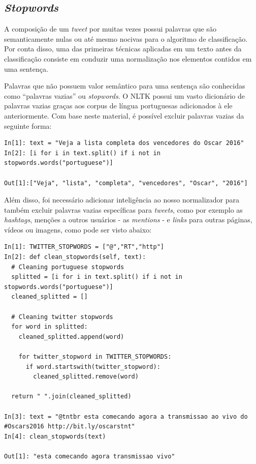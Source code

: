 \subsection{\textit{Stopwords}}

A composição de um \textit{tweet} por muitas vezes possui palavras que são semanticamente nulas ou até mesmo nocivas para o algoritmo de classificação. Por conta disso, uma das primeiras técnicas aplicadas em um texto antes da classificação consiste em conduzir uma normalização nos elementos contidos em uma sentença.

Palavras que não possuem valor semântico para uma sentença são conhecidas como \enquote{palavras vazias} ou \textit{stopwords}. O NLTK possui um vasto dicionário de palavras vazias graças aos corpus de língua portuguesas adicionados à ele anteriormente. Com base neste material, é possível excluir palavras vazias da seguinte forma:

\begin{lstlisting}[style=python, frame=single]
In[1]: text = "Veja a lista completa dos vencedores do Oscar 2016"
In[2]: [i for i in text.split() if i not in stopwords.words("portuguese")]

Out[1]:["Veja", "lista", "completa", "vencedores", "Oscar", "2016"]
\end{lstlisting}

Além disso, foi necessário adicionar inteligência ao nosso normalizador para também excluir palavras vazias específicas para \textit{tweets}, como por exemplo as \textit{hashtags}, menções a outros usuários - as \textit{mentions} - e \textit{links} para outras páginas, vídeos ou imagens, como pode ser visto abaixo:

\begin{lstlisting}[style=python, frame=single]
In[1]: TWITTER_STOPWORDS = ["@","RT","http"]
In[2]: def clean_stopwords(self, text):
  # Cleaning portuguese stopwords
  splitted = [i for i in text.split() if i not in stopwords.words("portuguese")]
  cleaned_splitted = []

  # Cleaning twitter stopwords
  for word in splitted:
    cleaned_splitted.append(word)

    for twitter_stopword in TWITTER_STOPWORDS:
      if word.startswith(twitter_stopword):
        cleaned_splitted.remove(word)

  return " ".join(cleaned_splitted)

In[3]: text = "@tntbr esta comecando agora a transmissao ao vivo do #Oscars2016 http://bit.ly/oscarstnt"
In[4]: clean_stopwords(text)

Out[1]: "esta comecando agora transmissao vivo"

\end{lstlisting}



